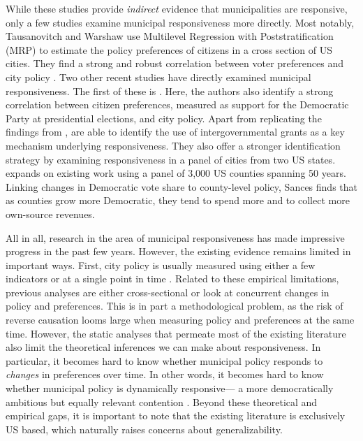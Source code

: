 \documentclass[a4paper,12pt]{article}
\begin{document}
While these studies provide \textit{indirect} evidence that municipalities are responsive, only a few studies examine municipal responsiveness more directly. Most notably, Tausanovitch and Warshaw use Multilevel Regression with Poststratification (MRP) to estimate the policy preferences of citizens in a cross section of US cities. They find a strong and robust correlation between voter preferences and city policy \citep[for earlier efforts, see ][]{hajnal2010or,palus2010responsiveness}. Two other recent studies have directly examined municipal responsiveness. The first of these is \cite{einstein2016pushing}. Here, the authors also identify a strong correlation between citizen preferences, measured as support for the Democratic Party at presidential elections,  and city policy. Apart from replicating the findings from \citeauthor{tausanovitch2014representation}, \citeauthor{einstein2016pushing} are able to identify the use of intergovernmental grants as a key mechanism underlying responsiveness. They also offer a stronger identification strategy by examining responsiveness in a panel of cities from two US states.  \citet{sances2017voters} expands on existing work using a panel of 3,000 US counties spanning 50 years. Linking changes in Democratic vote share to county-level policy, Sances finds that as counties grow more Democratic, they tend to spend more and to collect more own-source revenues.



All in all, research in the area of municipal responsiveness has made impressive progress in the past few years. However, the existing evidence remains limited in important ways. First, city policy is usually measured using either a few indicators \citep{sances2017voters,einstein2016pushing} or at a single point in time \citep{tausanovitch2014representation}. Related to these empirical limitations, previous analyses are either cross-sectional or look at concurrent changes in policy and preferences. This is in part a methodological problem, as the risk of reverse causation looms large when measuring policy and preferences at the same time. However, the static analyses that permeate most of the existing literature also limit the theoretical inferences we can make about responsiveness. In particular, it becomes hard to know whether municipal policy responds to \textit{changes} in preferences over time. In other words, it becomes hard to know whether municipal policy is dynamically responsive--- a more democratically ambitious but equally relevant contention \citep[cf.][]{stimson1995dynamic}. Beyond these theoretical and empirical gaps, it is important to note that the existing literature is exclusively US based, which naturally raises concerns about generalizability.
\end{document}

